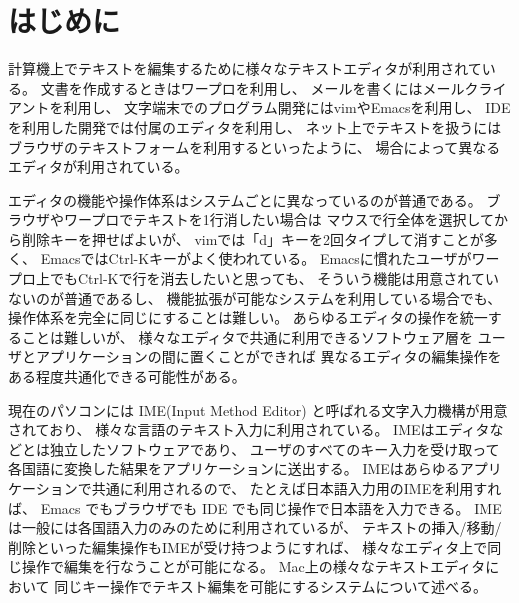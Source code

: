 \section{はじめに}

計算機上でテキストを編集するために様々なテキストエディタが利用されている。
文書を作成するときはワープロを利用し、
メールを書くにはメールクライアントを利用し、
文字端末でのプログラム開発にはvimやEmacsを利用し、
IDEを利用した開発では付属のエディタを利用し、
ネット上でテキストを扱うにはブラウザのテキストフォームを利用するといったように、
場合によって異なるエディタが利用されている。

エディタの機能や操作体系はシステムごとに異なっているのが普通である。
ブラウザやワープロでテキストを1行消したい場合は
マウスで行全体を選択してから削除キーを押せばよいが、
vimでは「d」キーを2回タイプして消すことが多く、
EmacsではCtrl-Kキーがよく使われている。
Emacsに慣れたユーザがワープロ上でもCtrl-Kで行を消去したいと思っても、
そういう機能は用意されていないのが普通であるし、
機能拡張が可能なシステムを利用している場合でも、
操作体系を完全に同じにすることは難しい。
%
あらゆるエディタの操作を統一することは難しいが、
様々なエディタで共通に利用できるソフトウェア層を
ユーザとアプリケーションの間に置くことができれば
異なるエディタの編集操作をある程度共通化できる可能性がある。

現在のパソコンには IME(Input Method Editor) と呼ばれる文字入力機構が用意されており、
様々な言語のテキスト入力に利用されている。
IMEはエディタなどとは独立したソフトウェアであり、
ユーザのすべてのキー入力を受け取って
各国語に変換した結果をアプリケーションに送出する。
IMEはあらゆるアプリケーションで共通に利用されるので、
たとえば日本語入力用のIMEを利用すれば、
Emacs でもブラウザでも IDE でも同じ操作で日本語を入力できる。
IMEは一般には各国語入力のみのために利用されているが、
テキストの挿入/移動/削除といった編集操作もIMEが受け持つようにすれば、
様々なエディタ上で同じ操作で編集を行なうことが可能になる。
%
Mac上の様々なテキストエディタにおいて
同じキー操作でテキスト編集を可能にする{\system}システムについて述べる。

